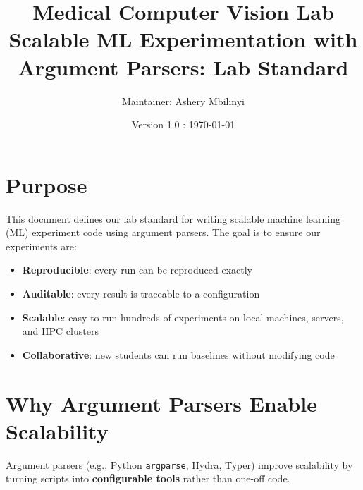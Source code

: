 \documentclass[11pt]{article}
\title{\textbf{Medical Computer Vision Lab \\ \small{
Scalable ML Experimentation with Argument Parsers: Lab Standard}}}
\author{Maintainer: Ashery Mbilinyi}
\date{Version 1.0 : \today}
\begin{document}
\maketitle

\tableofcontents
\newpage




\section{Purpose}
This document defines our lab standard for writing scalable machine learning (ML) experiment code using argument parsers.
The goal is to ensure our experiments are:
\begin{itemize}
    \item \textbf{Reproducible}: every run can be reproduced exactly
    \item \textbf{Auditable}: every result is traceable to a configuration
    \item \textbf{Scalable}: easy to run hundreds of experiments on local machines, servers, and HPC clusters
    \item \textbf{Collaborative}: new students can run baselines without modifying code
\end{itemize}

\section{Why Argument Parsers Enable Scalability}
Argument parsers (e.g., Python \texttt{argparse}, Hydra, Typer) improve scalability by turning scripts into \textbf{configurable tools} rather than one-off code.
\end{document}
